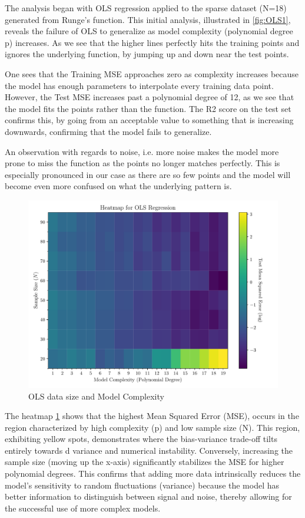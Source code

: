 \documentclass[twocolumn,aps]{revtex4}
\begin{document}
The analysis began with OLS regression applied to the sparse dataset (N=18) generated from Runge’s function. 
This initial analysis, illustrated in \ref{fig:OLS1}, reveals the failure of OLS to generalize as model complexity (polynomial degree p) increases. 
As we see that the higher lines perfectly hits the training points and ignores the underlying function, by jumping up and down near the test points.

One sees that the Training MSE approaches zero as complexity increases because the model has enough parameters to interpolate every training data point. 
However, the Test MSE increases past a polynomial degree of 12, as we see that the model fits the points rather than the function.
The R2 score on the test set confirms this, by going from an acceptable value to something that is increasing downwards, confirming that the model fails to generalize.

An observation with regards to noise, i.e. more noise makes the model more prone to miss the function as the points no longer matches perfectly. This is especially pronounced in our case as there are so few points and the model will become even more confused on what the underlying pattern is.
\begin{figure}[H]
    \centering
    \includegraphics[width=.95 \linewidth]{Figures/OLS_Heatmap.pdf}
    \caption{OLS data size and Model Complexity}
    \label{fig:OLSHeat}
\end{figure}


The heatmap \ref{fig:OLSHeat} shows that the highest Mean Squared Error (MSE), occurs in the region characterized by high complexity (p) and low sample size (N). 
This region, exhibiting yellow spots, demonstrates where the bias-variance trade-off tilts entirely towards d variance and numerical instability. 
Conversely, increasing the sample size (moving up the x-axis) significantly stabilizes the MSE for higher polynomial degrees. 
This confirms that adding more data intrinsically reduces the model's sensitivity to random fluctuations (variance) because the model has better information to distinguish between signal and noise, thereby allowing for the successful use of more complex models.
\end{document}
